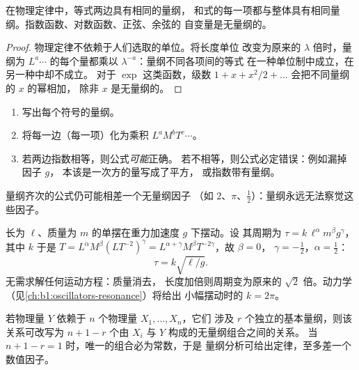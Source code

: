 \begin{theorem}[量纲齐次性原理]\label{thm:b1:units-dimensions:homogeneity}
在物理定律中，等式两边具有相同的量纲，
和式的每一项都与整体具有相同量纲。指数函数、对数函数、正弦、余弦的
自变量是无量纲的。
\end{theorem}

\begin{proof}
物理定律不依赖于人们选取的单位。将长度单位
改变为原来的 $\lambda$ 倍时，量纲为
$L^a \cdots$ 的每个量都乘以 $\lambda^{-a}$：量纲不同各项间的等式
在一种单位制中成立，在另一种中却不成立。
对于 $\exp$ 这类函数，级数
$1 + x + x^2/2 + \dots$ 会把不同量纲的 $x$ 的幂相加，
除非 $x$ 是无量纲的。
\end{proof}

\begin{method}[检验公式]\label{met:b1:units-dimensions:check}
\begin{enumerate}
  \item 写出每个符号的量纲。
  \item 将每一边（每一项）化为乘积 $L^a M^b T^c \cdots$。
  \item 若两边指数相等，则公式\emph{可能}正确。
        若不相等，则公式必定错误：例如漏掉因子 $g$，
        本该是一次方的量写成了平方，
        或指数带有量纲。
\end{enumerate}
量纲齐次的公式仍可能相差一个无量纲因子
（如 $2$、$\pi$、$\tfrac12$）：量纲永远无法察觉这些因子。
\end{method}

\begin{example}[单摆的周期]\label{ex:b1:units-dimensions:pendulum}
长为 $\ell$、质量为 $m$ 的单摆在重力加速度 $g$ 下摆动。设
其周期为 $\tau = k\,\ell^\alpha m^\beta g^\gamma$，其中 $k$
于是 $T = L^\alpha M^\beta (L T^{-2})^\gamma =
L^{\alpha+\gamma} M^\beta T^{-2\gamma}$，故 $\beta = 0$，
$\gamma = -\tfrac12$，$\alpha = \tfrac12$：
\[
\tau = k\sqrt{\ell/g} .
\]
无需求解任何运动方程：质量消去，
长度加倍则周期变为原来的 $\sqrt2$ 倍。动力学
（见\cref{ch:b1:oscillators-resonance}）将给出
小幅摆动时的 $k = 2\pi$。
\end{example}

\begin{proposition}[无量纲组合]\label{prop:b1:units-dimensions:pi}
若物理量 $Y$ 依赖于 $n$ 个物理量 $X_1, \dots, X_n$，它们
涉及 $r$ 个独立的基本量纲，则该关系可改写为
$n + 1 - r$ 个由 $X_i$ 与 $Y$ 构成的无量纲组合之间的关系。
当 $n + 1 - r = 1$ 时，唯一的组合必为常数，于是
量纲分析可给出定律，至多差一个数值因子。
\end{proposition}
\admitted

